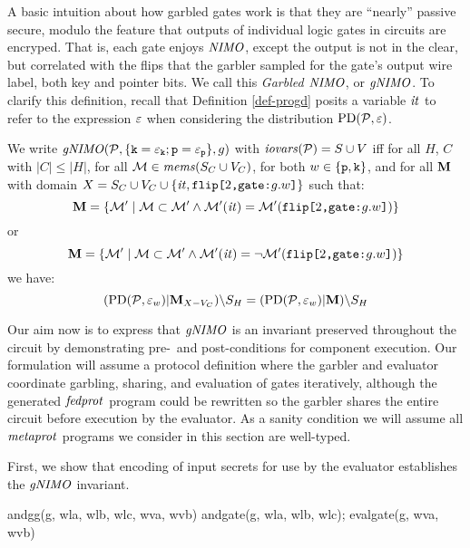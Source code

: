 A basic intuition about how garbled gates work is that they are
``nearly'' passive secure, modulo the feature that outputs of
individual logic gates in circuits are encryped. That is, each gate
enjoys $\mathit{NIMO}$, except the output is not in the clear, but correlated
with the flips that the garbler sampled for the gate's output wire
label, both key and pointer bits. We call this \emph{Garbled $\mathit{NIMO}$},
or $\mathit{gNIMO}$. To clarify this definition, recall that Definition \ref{def-progd}
posits a variable $\mathit{it}$ to refer to the expression $\varepsilon$ when
considering the distribution $\mathrm{PD}(\mathcal{P},\varepsilon)$.
\begin{definition}
  We write $\mathit{gNIMO}(\mathcal{P},\{ \texttt{k} = \varepsilon_{\texttt{k}}; \texttt{p} =
  \varepsilon_{\texttt{p}}\}, g)$ with $\mathit{iovars}(\mathcal{P}) = S \cup V$ iff for all $H$,
  $C$ with $|C| \le |H|$, for all $\mathcal{M} \in \mathit{mems}(S_C \cup V_C)$,
  for both $w \in \{\texttt{p},\texttt{k}\}$, and for all $\mathbf{M}$ with
  domain $X = S_C \cup V_C \cup \{ \mathit{it}, \texttt{flip[}2\texttt{,}\texttt{gate:}g.w\texttt{]} \}$
  such that:
  $$
  \mathbf{M} = \{ \mathcal{M}' \mid \mathcal{M} \subset \mathcal{M}' \wedge 
  \mathcal{M}'(\mathit{it}) = \mathcal{M}'(\texttt{flip[}2\texttt{,}\texttt{gate:}g.w\texttt{]}) \} 
  $$
  or
  $$
  \mathbf{M} = \{ \mathcal{M}' \mid \mathcal{M} \subset \mathcal{M}' \wedge 
  \mathcal{M}'(\mathit{it}) = \neg\mathcal{M}'(\texttt{flip[}2\texttt{,}\texttt{gate:}g.w\texttt{]}) \} 
  $$
  we have:
  $$
  (\mathrm{PD}(\mathcal{P},\varepsilon_w)|\mathbf{M}_{X-{V_C}})\backslash S_H =
  (\mathrm{PD}(\mathcal{P},\varepsilon_w)|\mathbf{M})\backslash S_H
  $$
\end{definition}

Our aim now is to express that $\mathit{gNIMO}$ is an invariant preserved throughout
the circuit by demonstrating pre-~and post-conditions for component execution.
Our formulation will assume a protocol definition where the garbler and
evaluator coordinate garbling, sharing, and evaluation of gates iteratively,
although the generated $\mathit{fedprot}$ program could be rewritten so the garbler
shares the entire circuit before execution by the evaluator. As a sanity
condition we will assume all $\mathit{metaprot}$ programs we consider in this
section are well-typed. 

First, we show that encoding of input secrets for use by the evaluator
establishes the $\mathit{gNIMO}$ invariant.

\begin{verbatimtab}
andgg(g, wla, wlb, wlc, wva, wvb) {
andgate(g, wla, wlb, wlc);
evalgate(g, wva, wvb)
}
\end{verbatimtab}


